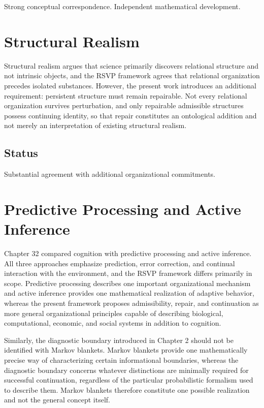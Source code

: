 \documentclass[11pt,oneside]{book}
\numberwithin{equation}{chapter}
\theoremstyle{definition}
\theoremstyle{plain}
\begin{document}
Strong conceptual correspondence. Independent mathematical development.

\section{Structural Realism}

Structural realism argues that science primarily discovers relational structure and not intrinsic objects, and the RSVP framework agrees that relational organization precedes isolated substances. However, the present work introduces an additional requirement: persistent structure must remain repairable. Not every relational organization survives perturbation, and only repairable admissible structures possess continuing identity, so that repair constitutes an ontological addition and not merely an interpretation of existing structural realism.

\subsection*{Status}

Substantial agreement with additional organizational commitments.

\section{Predictive Processing and Active Inference}

Chapter 32 compared cognition with predictive processing and active inference. All three approaches emphasize prediction, error correction, and continual interaction with the environment, and the RSVP framework differs primarily in scope. Predictive processing describes one important organizational mechanism and active inference provides one mathematical realization of adaptive behavior, whereas the present framework proposes admissibility, repair, and continuation as more general organizational principles capable of describing biological, computational, economic, and social systems in addition to cognition.

Similarly, the diagnostic boundary introduced in Chapter 2 should not be identified with Markov blankets. Markov blankets provide one mathematically precise way of characterizing certain informational boundaries, whereas the diagnostic boundary concerns whatever distinctions are minimally required for successful continuation, regardless of the particular probabilistic formalism used to describe them. Markov blankets therefore constitute one possible realization and not the general concept itself.
\end{document}
